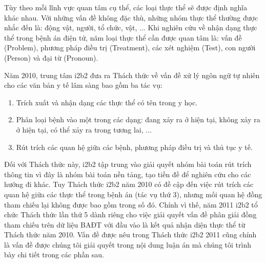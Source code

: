 Tùy theo mỗi lĩnh vực quan tâm cụ thể, các loại thực thể sẽ được định nghĩa khác nhau. Với những vấn đề không đặc thù, những nhóm thực thể thường được nhắc đến là: động vật, người, tổ chức, vật, ... Khi nghiên cứu về nhận dạng thực thể trong bệnh án điện tử, năm loại thực thể cần được quan tâm là: vấn đề (Problem), phương pháp điều trị (Treatment), các xét nghiệm (Test), con người (Person) và đại từ (Pronoun).

Năm 2010, trung tâm i2b2 đưa ra Thách thức về vấn đề xử lý ngôn ngữ tự nhiên cho các văn bản y tế lâm sàng bao gồm ba tác vụ:

\begin{enumerate}
\item Trích xuất và nhận dạng các thực thể có tên trong y học.
\item Phân loại bệnh vào một trong các dạng: đang xảy ra ở hiện tại, không xảy ra ở hiện tại, có thể xảy ra trong tương lai, ...
\item Rút trích các quan hệ giữa các bệnh, phương pháp điều trị và thủ tục y tế.
\end{enumerate}

Đối với Thách thức này, i2b2 tập trung vào giải quyết nhóm bài toán rút trích thông tin vì đây là nhóm bài toán nền tảng, tạo tiền đề để nghiên cứu cho các hướng đi khác. Tuy Thách thức i2b2 năm 2010 có đề cập đến việc rút trích các quan hệ giữa các thực thể trong bệnh án (tác vụ thứ 3), nhưng mối quan hệ đồng tham chiếu lại không được bao gồm trong số đó. Chính vì thế, năm 2011 i2b2 tổ chức Thách thức lần thứ 5 dành riêng cho việc giải quyết vấn đề phân giải đồng tham chiếu trên dữ liệu BAĐT với đầu vào là kết quả nhận diện thực thể từ Thách thức năm 2010. Vấn đề được nêu trong Thách thức i2b2 2011 cũng chính là vấn đề được chúng tôi giải quyết trong nội dung luận án mà chúng tôi trình bày chi tiết trong các phần sau.